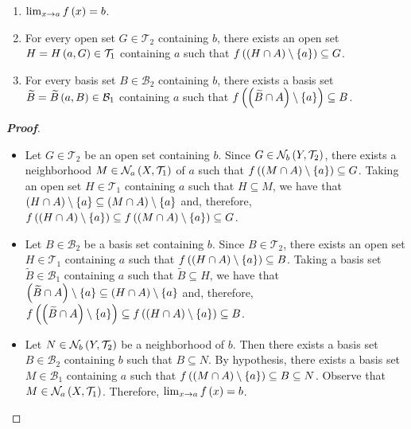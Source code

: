 \begin{proposition}
  \begin{enumerate}
    \item $\lim_{x\to a}{f\left(x\right)}=b$.
    \item For every open set $G\in\mathcal{T}_2$ containing $b$, there exists an open set $H=H\left(a,G\right)\in\mathcal{T}_1$ containing $a$ such that $f\left(\left(H\cap A\right)\setminus\left\{a\right\}\right)\subseteq G$.
    \item For every basis set $B\in\mathcal{B}_2$ containing $b$, there exists a basis set $\widetilde{B}=\widetilde{B}\left(a,B\right)\in\mathcal{B}_1$ containing $a$ such that $f\left(\left(\widetilde{B}\cap A\right)\setminus\left\{a\right\}\right)\subseteq B$.
  \end{enumerate}
  \begin{proof}[\rm\textbf{Proof}]
    \hfill
    \begin{itemize}
    \item[\boxed{1\Rightarrow2}] Let $G\in\mathcal{T}_2$ be an open set containing $b$. Since $G\in\mathcal{N}_b\left(Y,\mathcal{T}_2\right)$, there exists a neighborhood $M\in\mathcal{N}_a\left(X,\mathcal{T}_1\right)$ of $a$ such that $f\left(\left(M\cap A\right)\setminus\left\{a\right\}\right)\subseteq G$. Taking an open set $H\in\mathcal{T}_1$ containing $a$ such that $H\subseteq M$, we have that $\left(H\cap A\right)\setminus\left\{a\right\}\subseteq\left(M\cap A\right)\setminus\left\{a\right\}$ and, therefore, $f\left(\left(H\cap A\right)\setminus\left\{a\right\}\right)\subseteq f\left(\left(M\cap A\right)\setminus\left\{a\right\}\right)\subseteq G$.
    \item[\boxed{2\Rightarrow3}] Let $B\in\mathcal{B}_2$ be a basis set containing $b$. Since $B\in\mathcal{T}_2$, there exists an open set $H\in\mathcal{T}_1$ containing $a$ such that $f\left(\left(H\cap A\right)\setminus\left\{a\right\}\right)\subseteq B$. Taking a basis set $\widetilde{B}\in\mathcal{B}_1$ containing $a$ such that $\widetilde{B}\subseteq H$, we have that $\left(\widetilde{B}\cap A\right)\setminus\left\{a\right\}\subseteq\left(H\cap A\right)\setminus\left\{a\right\}$ and, therefore, $f\left(\left(\widetilde{B}\cap A\right)\setminus\left\{a\right\}\right)\subseteq f\left(\left(H\cap A\right)\setminus\left\{a\right\}\right)\subseteq B$.
    \item[\boxed{3\Rightarrow1}] Let $N\in\mathcal{N}_b\left(Y,\mathcal{T}_2\right)$ be a neighborhood of $b$. Then there exists a basis set $B\in\mathcal{B}_2$ containing $b$ such that $B\subseteq N$. By hypothesis, there exists a basis set $M\in\mathcal{B}_1$ containing $a$ such that $f\left(\left(M\cap A\right)\setminus\left\{a\right\}\right)\subseteq B\subseteq N$. Observe that $M\in\mathcal{N}_a\left(X,\mathcal{T}_1\right)$. Therefore, $\lim_{x\to a}{f\left(x\right)}=b$.
  \end{itemize}
  \end{proof}
\end{proposition}

